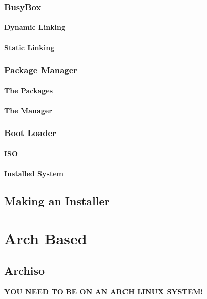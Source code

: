 \documentclass{article}
\begin{document}
		\subsubsection{BusyBox}
			\paragraph{Dynamic Linking}
			\paragraph{Static Linking}	
		\subsubsection{Package Manager}	
			\paragraph{The Packages}
			\paragraph{The Manager}
		\subsubsection{Boot Loader}
			\paragraph{ISO}
			\paragraph{Installed System}
		\subsection{Making an Installer}
\section{Arch Based}
\subsection{Archiso}
	\label{Archiso}
	\textbf{YOU NEED TO BE ON AN ARCH LINUX SYSTEM!}	
\end{document}

